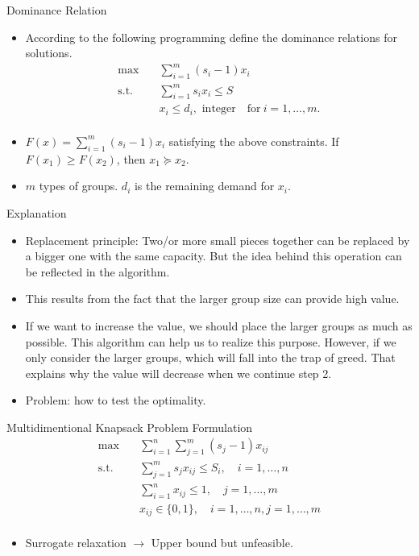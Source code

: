 \begin{frame}{Dominance Relation}
  \begin{itemize}
    \item According to the following programming define the dominance relations for solutions.
    \[\begin{split}\mbox{max}\quad & \sum_{i=1}^m (s_i-1) x_{i}\\
    \mbox{s.t.} \quad & \sum_{i=1}^m s_i x_i \leq S  \\
    & x_i \leq d_i, \mbox{ integer}\quad \mbox{for}~ i=1,\ldots,m.\\\end{split}\]
    \item $F(x) = \sum_{i=1}^m (s_i-1) x_{i}$ satisfying the above constraints. If $F(x_1)\geq F(x_2)$, then $x_1 \succeq x_2$.
    \item $m$ types of groups. $d_i$ is the remaining demand for $x_i$.
  \end{itemize}
\end{frame}

\begin{frame}{Explanation}
  \begin{itemize}
    \item Replacement principle: Two/or more small pieces together can be replaced by a bigger one with the same capacity. But the idea behind this operation can be reflected in the algorithm.
    \item This results from the fact that the larger group size can provide high value.
    \item If we want to increase the value, we should place the larger groups as much as possible. This algorithm can help us to realize this purpose. However, if we only consider the larger groups, which will fall into the trap of greed. That explains why the value will decrease when we continue step 2.
    \item Problem: how to test the optimality.
  \end{itemize}
\end{frame}

\begin{frame}{Multidimentional Knapsack Problem Formulation}
  \[\begin{split}\mbox{max}\quad & \sum_{i=1}^n\sum_{j=1}^m (s_j-1) x_{ij}\\
  \mbox{s.t.} \quad & \sum_{j=1}^m s_j x_{ij} \leq S_i, \quad i=1,\ldots,n \\
  & \sum_{i=1}^n x_{ij} \leq 1 ,\quad j=1,\ldots,m\\
  & x_{ij} \in \{0,1\}, \quad i=1,\ldots,n, j=1,\ldots,m\\\end{split}\]
  \begin{itemize}
    \item Surrogate relaxation $\to$ Upper bound but unfeasible.
  \end{itemize}
\end{frame}
